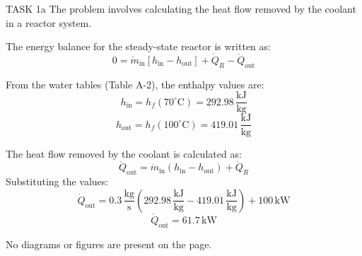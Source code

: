 TASK 1a  
The problem involves calculating the heat flow removed by the coolant in a reactor system.  

The energy balance for the steady-state reactor is written as:  
\[
0 = \dot{m}_{\text{in}} \left[ h_{\text{in}} - h_{\text{out}} \right] + \dot{Q}_R - \dot{Q}_{\text{out}}
\]  

From the water tables (Table A-2), the enthalpy values are:  
\[
h_{\text{in}} = h_f(70^\circ\text{C}) = 292.98 \, \frac{\text{kJ}}{\text{kg}}
\]  
\[
h_{\text{out}} = h_f(100^\circ\text{C}) = 419.01 \, \frac{\text{kJ}}{\text{kg}}
\]  

The heat flow removed by the coolant is calculated as:  
\[
\dot{Q}_{\text{out}} = \dot{m}_{\text{in}} \left( h_{\text{in}} - h_{\text{out}} \right) + \dot{Q}_R
\]  
Substituting the values:  
\[
\dot{Q}_{\text{out}} = 0.3 \, \frac{\text{kg}}{\text{s}} \left( 292.98 \, \frac{\text{kJ}}{\text{kg}} - 419.01 \, \frac{\text{kJ}}{\text{kg}} \right) + 100 \, \text{kW}
\]  
\[
\dot{Q}_{\text{out}} = 61.7 \, \text{kW}
\]  

No diagrams or figures are present on the page.